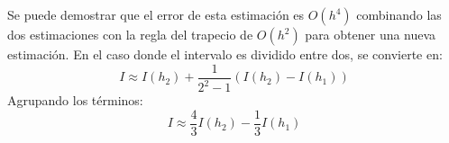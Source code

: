 Se puede demostrar que el error de esta estimación es $O(h^4)$ combinando las dos estimaciones con la regla del trapecio de $O(h^2)$ para obtener una nueva estimación. En el caso donde el intervalo es dividido entre dos, se convierte en:
\begin{equation*}
    I \approx I(h_2) + \frac{1}{2^2- 1}\left(I(h_2) - I(h_1)\right)
\end{equation*}
Agrupando los términos:
\begin{equation}
    I \approx \frac{4}{3}I(h_2) - \frac{1}{3}I(h_1)
\end{equation}




